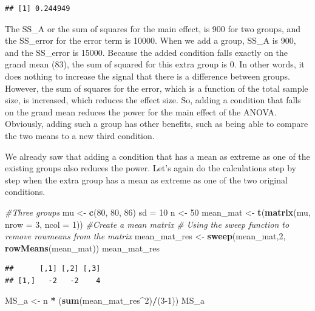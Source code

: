 \documentclass[]{book}
\newenvironment{Shaded}{\begin{snugshade}}{\end{snugshade}}
\newcommand{\CommentTok}[1]{\textcolor[rgb]{0.56,0.35,0.01}{\textit{#1}}}
\newcommand{\DataTypeTok}[1]{\textcolor[rgb]{0.13,0.29,0.53}{#1}}
\newcommand{\DecValTok}[1]{\textcolor[rgb]{0.00,0.00,0.81}{#1}}
\newcommand{\KeywordTok}[1]{\textcolor[rgb]{0.13,0.29,0.53}{\textbf{#1}}}
\newcommand{\NormalTok}[1]{#1}
\newcommand{\OperatorTok}[1]{\textcolor[rgb]{0.81,0.36,0.00}{\textbf{#1}}}
\newcommand{\StringTok}[1]{\textcolor[rgb]{0.31,0.60,0.02}{#1}}
\begin{document}
\begin{verbatim}
## [1] 0.244949
\end{verbatim}

The SS\_A or the sum of squares for the main effect, is 900 for two groups, and the SS\_error for the error term is 10000. When we add a group, SS\_A is 900, and the SS\_error is 15000. Because the added condition falls exactly on the grand mean (83), the sum of squared for this extra group is 0. In other words, it does nothing to increase the signal that there is a difference between groups. However, the sum of squares for the error, which is a function of the total sample size, is increased, which reduces the effect size. So, adding a condition that falls on the grand mean reduces the power for the main effect of the ANOVA. Obviously, adding such a group has other benefits, such as being able to compare the two means to a new third condition.

We already saw that adding a condition that has a mean as extreme as one of the existing groups also reduces the power. Let's again do the calculations step by step when the extra group has a mean as extreme as one of the two original conditions.

\begin{Shaded}
\begin{Highlighting}[]
\CommentTok{#Three groups}
\NormalTok{mu <-}\StringTok{ }\KeywordTok{c}\NormalTok{(}\DecValTok{80}\NormalTok{, }\DecValTok{80}\NormalTok{, }\DecValTok{86}\NormalTok{)}
\NormalTok{sd =}\StringTok{ }\DecValTok{10}
\NormalTok{n <-}\StringTok{ }\DecValTok{50}
\NormalTok{mean_mat <-}\StringTok{ }\KeywordTok{t}\NormalTok{(}\KeywordTok{matrix}\NormalTok{(mu, }
                     \DataTypeTok{nrow =} \DecValTok{3}\NormalTok{,}
                     \DataTypeTok{ncol =} \DecValTok{1}\NormalTok{)) }\CommentTok{#Create a mean matrix}
\CommentTok{# Using the sweep function to remove rowmeans from the matrix}
\NormalTok{mean_mat_res <-}\StringTok{ }\KeywordTok{sweep}\NormalTok{(mean_mat,}\DecValTok{2}\NormalTok{, }\KeywordTok{rowMeans}\NormalTok{(mean_mat))   }
\NormalTok{mean_mat_res}
\end{Highlighting}
\end{Shaded}

\begin{verbatim}
##      [,1] [,2] [,3]
## [1,]   -2   -2    4
\end{verbatim}

\begin{Shaded}
\begin{Highlighting}[]
\NormalTok{MS_a <-}\StringTok{ }\NormalTok{n }\OperatorTok{*}\StringTok{ }\NormalTok{(}\KeywordTok{sum}\NormalTok{(mean_mat_res}\OperatorTok{^}\DecValTok{2}\NormalTok{)}\OperatorTok{/}\NormalTok{(}\DecValTok{3-1}\NormalTok{))}
\NormalTok{MS_a}
\end{Highlighting}
\end{Shaded}
\end{document}
